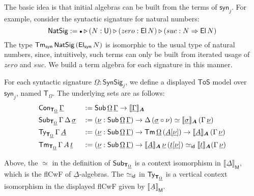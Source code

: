 \documentclass[sigplan,review,anonymous]{acmart}\settopmatter{printfolios=true,printccs=false,printacmref=false}
\newcommand{\ToS}{\mathsf{ToS}}
\newcommand{\ext}{\triangleright}
\newcommand{\emptycon}{\scaleobj{.75}\bullet}
\newcommand{\NatSig}{\mathsf{NatSig}}
\newcommand{\arri}{\Rightarrow}
\newcommand{\syn}{\mathsf{syn}}
\newcommand{\SynSig}{\mathsf{SynSig}}
\newcommand{\bA}{\boldsymbol{A}}
\newcommand{\bM}{\boldsymbol{\mathsf{M}}}
\newcommand{\bT}{\boldsymbol{\mathsf{T}}}
\newcommand{\ul}[1]{\underline{#1}}
\newcommand{\ulGamma}{\ul{\Gamma}}
\newcommand{\ulDelta}{\ul{\Delta}}
\newcommand{\ulOmega}{\ul{\Omega}}
\newcommand{\ulsigma}{\ul{\sigma}}
\newcommand{\ulnu}{\ul{\nu}}
\newcommand{\ult}{\ul{t}}
\newcommand{\ulA}{\ul{A}}
\newcommand{\llb}{\llbracket}
\newcommand{\rrb}{\rrbracket}
\begin{document}
The basic idea is that initial algebras can be built from the terms of $\syn_j$.
For example, consider the syntactic signature for natural numbers:
\[
\NatSig := \emptycon\ext(N : \U)\ext(zero : \El\,N)\ext (suc : N
\arri \El\,N)
\]
The type $\Tm_{\syn}\,\NatSig\,(\El_{\syn}\,N)$ is isomorphic to the usual type
of natural numbers, since, intuitively, such terms can only be built from
iterated usage of $zero$ and $suc$. We build a term algebra for each
signature in this manner.

\begin{definition}
For each syntactic signature $\ulOmega : \SynSig_j$, we define a displayed $\ToS$
model over $\syn_j$, named $\bT_{\ulOmega}$. The underlying sets are as follows:
\begin{alignat*}{3}
  & \Con_{\bT_{\ulOmega}}\,\ulGamma &&:= \Sub\,\ulOmega\,\ulGamma \ra \llb\ulGamma\rrb_{\bA}\\
  & \Sub_{\bT_{\ulOmega}}\,\Gamma\,\Delta\,\ulsigma &&:= (\ulnu : \Sub\,\ulOmega\,\ulGamma)
  \ra \Delta\,(\ulsigma\circ\nu) \simeq \llb\ulsigma\rrb_{\bA}\,(\Gamma\,\ulnu)\\
  & \Ty_{\bT_{\ulOmega}}\,\Gamma\,\ulA &&:= (\ulnu : \Sub\,\ulOmega\,\ulGamma) \ra
    \Tm\,\ulOmega\,(\ulA[\ulnu]) \ra \llb\ulA\rrb_{\bA}\,(\Gamma\,\ulnu)\\
  & \Tm_{\bT_{\ulOmega}}\,\Gamma\,A\,\ult &&:= (\ulnu : \Sub\,\ulOmega\,\ulGamma)\ra
    \llb\ulA\rrb_{\bA}\,\ulnu\,(\ult[\ulnu]) \simeq_{\id} \llb\ult\rrb_{\bA} (\Gamma\,\ulnu)
\end{alignat*}

Above, the $\simeq$ in the definition of $\Sub_{\bT_{\ulOmega}}$ is a context isomorphism
in $\llb\ulDelta\rrb_{\bM}$, which is the flCwF of $\ulDelta$-algebras. The
$\simeq_{\mathsf{id}}$ in $\Ty_{\bT_{\ulOmega}}$ is a vertical context isomorphism in the displayed
flCwF given by $\llb\ulA\rrb_{\bM}$.


\end{definition}
\end{document}
